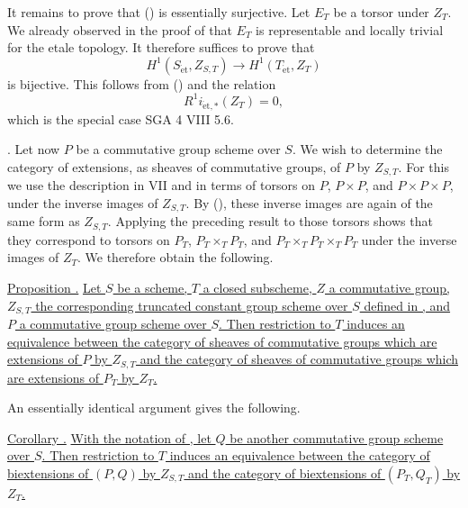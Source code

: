 It remains to prove that () is essentially surjective.  Let $E_T$
be a torsor under $Z_T$.  We already observed in the proof of  that
$E_T$ is representable and locally trivial for the etale topology.  It
therefore suffices to prove that
\[
 H^1(S_{\mathrm{\acute{e}t}},Z_{S,T})
 \longrightarrow H^1(T_{\mathrm{\acute{e}t}},Z_T)
\]
is bijective.  This follows from () and the relation
\[
 R^1i_{\mathrm{\acute{e}t},*}(Z_T)=0,
\]
which is the special case SGA 4 VIII 5.6.

\medskip
\noindent {}.  Let now $P$ be a commutative group scheme over $S$.
We wish to determine the category of extensions, as sheaves of
commutative groups, of $P$ by $Z_{S,T}$.  For this we use the
description in VII  and  in terms of torsors on
$P$, $P\times P$, and $P\times P\times P$, under the inverse images
of $Z_{S,T}$.  By (), these inverse images are again of the same
form as $Z_{S,T}$.  Applying the preceding result to those torsors
shows that they correspond to torsors on
$P_T$, $P_T\times_TP_T$, and
$P_T\times_TP_T\times_TP_T$ under the inverse images of $Z_T$.
We therefore obtain the following.

\medskip
\noindent\underline{Proposition .}  \underline{Let $S$ be a scheme,
$T$ a closed subscheme, $Z$ a commutative group, $Z_{S,T}$ the
corresponding truncated constant group scheme over $S$ defined in
, and $P$ a commutative group scheme over $S$.  Then restriction to
$T$ induces an equivalence between the category of sheaves of
commutative groups which are extensions of $P$ by $Z_{S,T}$ and the
category of sheaves of commutative groups which are extensions of
$P_T$ by $Z_T$.}

An essentially identical argument gives the following.

\medskip
\noindent\underline{Corollary .}  \underline{With the notation of
, let $Q$ be another commutative group scheme over $S$.  Then
restriction to $T$ induces an equivalence between the category of
biextensions of $(P,Q)$ by $Z_{S,T}$ and the category of biextensions
of $(P_T,Q_T)$ by $Z_T$.}

